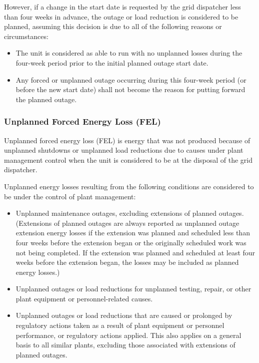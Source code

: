 However, if a change in the start date is requested by the grid
dispatcher less than four weeks in advance, the outage or load
reduction is considered to be planned, assuming this decision is due
to all of the following reasons or circumstances:
\begin{itemize}
\item The unit is considered as able to run with no unplanned losses during the four-week period prior to the initial planned outage start date.
\item Any forced or unplanned outage occurring during this four-week
  period (or before the new start date) shall not become the reason
  for putting forward the planned outage.
\end{itemize}

\subsubsection{Unplanned Forced Energy Loss (FEL)}

Unplanned forced energy loss (FEL) is energy that was not produced
because of unplanned shutdowns or unplanned load reductions due to
causes under plant management control when the unit is considered to
be at the disposal of the grid dispatcher.

Unplanned energy losses resulting from the following conditions are
considered to be under the control of plant management:
\begin{itemize}
\item Unplanned maintenance outages, excluding extensions of planned outages. (Extensions of planned outages are always reported as unplanned outage extension energy losses if the extension was planned and scheduled less than four weeks before the extension began or the originally scheduled work was not being completed. If the extension was planned and scheduled at least four weeks before the extension began, the losses may be included as planned energy losses.)
\item Unplanned outages or load reductions for unplanned testing, repair, or other plant equipment or personnel-related causes.
\item Unplanned outages or load reductions that are caused or
  prolonged by regulatory actions taken as a result of plant equipment
  or personnel performance, or regulatory actions applied. This also
  applies on a general basis to all similar plants, excluding those
  associated with extensions of planned outages.
\end{itemize}

